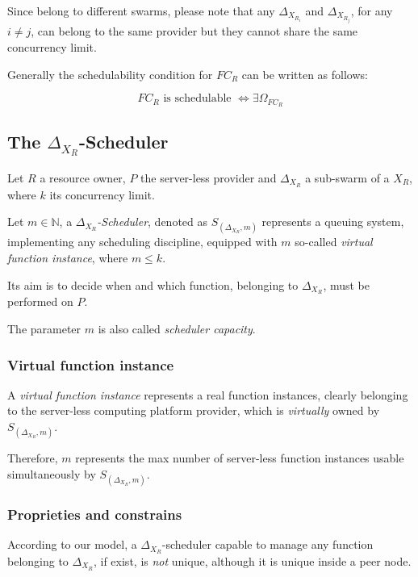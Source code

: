\documentclass[10pt,a4paper]{article}
\theoremstyle{definition}
\begin{document}
Since belong to different swarms, please note that any $\Delta_{X_{R_i}}$ and $\Delta_{X_{R_j}}$, for any $i \neq j$, can belong to the same provider but they cannot share the same concurrency limit.

Generally the schedulability condition for $FC_R$ can be written as follows:

\begin{equation}
FC_R \text{ is schedulable } \Leftrightarrow \exists \Omega_{FC_R}
\end{equation}


\subsection{The $\Delta_{X_{R}}$-Scheduler}

Let $R$ a resource owner, $P$ the server-less provider and $\Delta_{X_{R}}$ a sub-swarm of a $X_{R}$, where $k$ its concurrency limit.

Let $m \in \mathbb{N}$, a \textit{$\Delta_{X_{R}}$-Scheduler}, denoted as $S_{(\Delta_{X_{R}},m)}$ represents a queuing system, implementing any scheduling discipline, equipped with $m$ so-called \textit{virtual function instance}, where $m \leq k$.

Its aim is to decide when and which function, belonging to $\Delta_{X_{R}}$, must be performed on $P$. 

The parameter $m$ is also called \textit{scheduler capacity}.

\subsubsection{Virtual function instance}

A \textit{virtual function instance} represents a real function instances, clearly belonging to the server-less computing platform provider, which is \textit{virtually} owned by $S_{(\Delta_{X_{R}},m)}$.

Therefore, $m$ represents the max number of server-less function instances usable simultaneously by $S_{(\Delta_{X_{R}},m)}$.

\subsubsection{Proprieties and constrains}

According to our model, a $\Delta_{X_{R}}$-scheduler capable to manage any function belonging to $\Delta_{X_{R}}$, if exist, is \textit{not} unique, although it is unique inside a peer node. 
\end{document}
